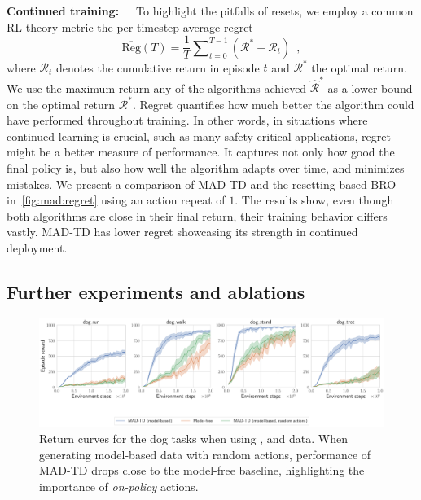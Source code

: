 \textbf{Continued training:}~~~To highlight the pitfalls of resets, we employ a common RL theory metric the per timestep average regret
\begin{equation*}
    \overline{\text{Reg}}(T) = \frac{1}{T} \sum\nolimits_{t=0}^{T-1} \left(\mathcal{R}^* - \mathcal{R}_t\right) \enspace,
\end{equation*}
where $\mathcal{R}_t$ denotes the cumulative return in episode $t$ and $\mathcal{R}^*$ the optimal return. We use the maximum return any of the algorithms achieved $\hat{\mathcal{R}}^*$  as a lower bound on the optimal return $\mathcal{R}^*$. Regret quantifies how much better the algorithm could have performed throughout training. In other words, in situations where continued learning is crucial, such as many safety critical applications, regret might be a better measure of performance. It captures not only how good the final policy is, but also how well the algorithm adapts over time, and minimizes mistakes. We present a comparison of MAD-TD and the resetting-based BRO in~\autoref{fig:mad:regret} using an action repeat of $1$. The results show, even though both algorithms are close in their final return, their training behavior differs vastly. MAD-TD has lower regret showcasing its strength in continued deployment.

\subsection{Further experiments and ablations}
\label{sec:mad:adv_robustness}
\begin{figure}[t]
    \centering
    \includegraphics[width=1.\linewidth]{figures/mad-td/dog_random_actions.pdf}
    \caption{Return curves for the dog tasks when using ,   and   data. When generating model-based data with random actions, performance of MAD-TD drops close to the model-free baseline, highlighting the importance of \emph{on-policy} actions.}
    \label{fig:mad:random_action}
\end{figure}

